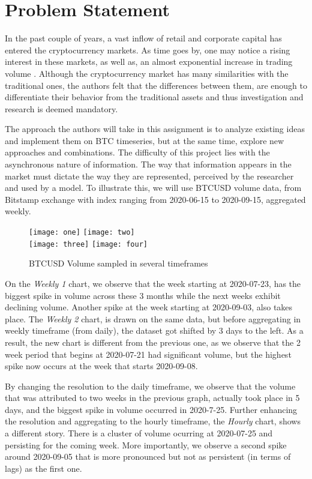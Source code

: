 \section{Problem Statement}

In the past couple of years, a vast inflow of retail and corporate capital has entered the cryptocurrency markets. As time goes by, one may notice a rising interest in these markets, as well as, an almost exponential increase in trading volume \cite{statista}. Although the cryptocurrency
market has many similarities with the traditional ones, the authors felt that the differences between them, are enough to differentiate their behavior from the traditional assets and thus investigation and research is deemed mandatory.

The approach the authors will take in this assignment is to analyze existing ideas and implement them on BTC timeseries, but at the same time, explore new approaches and combinations. The difficulty of this project lies with the asynchronous nature of information.
The way that information appears in the market must dictate the way they are represented, perceived by the researcher and used by a model. To illustrate this, we will use BTCUSD volume data, from Bitstamp exchange with index ranging from 2020-06-15 to 2020-09-15, aggregated weekly.

\begin{figure}[h]
	\centering
    \texttt{[image: one]}
    \texttt{[image: two]}
    \\[\smallskipamount]
    \texttt{[image: three]}
    \texttt{[image: four]}
    \caption{BTCUSD Volume sampled in several timeframes}\label{fig:example}
\end{figure}


On the \textit{Weekly 1} chart, we observe that the week starting at 2020-07-23, has the biggest spike in volume across these 3 months while the next weeks exhibit declining volume. Another spike at
the week starting at 2020-09-03, also takes place. The \textit{Weekly 2} chart, is drawn on the same data, but before aggregating in weekly
timeframe (from daily), the dataset got shifted by 3 days to the left. As a result, the new chart is different from the previous one, as we observe
that the 2 week period that begins at 2020-07-21 had significant volume, but the highest spike now occurs at the week that starts 2020-09-08.

By changing the resolution to the daily timeframe, we observe that the volume that was attributed to two weeks in the previous graph, actually took place in 5 days, and the biggest spike in volume occurred in 2020-7-25. Further enhancing the resolution and aggregating to the hourly timeframe, the \textit{Hourly} chart,
shows a different story. There is a cluster of volume ocurring at 2020-07-25 and persisting for
the coming week. More importantly, we observe a second spike around 2020-09-05 that is more pronounced but not as persistent (in terms of lags) as the first one.

